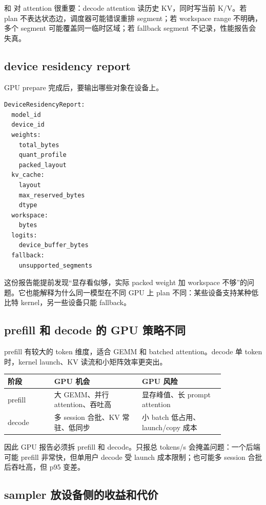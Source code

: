  和  对 attention 很重要：decode attention 读历史 KV，同时写当前 K/V。若 plan 不表达状态边，调度器可能错误重排 segment；若 workspace range 不明确，多个 segment 可能覆盖同一临时区域；若 fallback segment 不记录，性能报告会失真。

\subsection{device residency report}

GPU prepare 完成后，要输出哪些对象在设备上。

\begin{lstlisting}[numbers=none,caption={DeviceResidencyReport}]
DeviceResidencyReport:
  model_id
  device_id
  weights:
    total_bytes
    quant_profile
    packed_layout
  kv_cache:
    layout
    max_reserved_bytes
    dtype
  workspace:
    bytes
  logits:
    device_buffer_bytes
  fallback:
    unsupported_segments
\end{lstlisting}

这份报告能提前发现“显存看似够，实际 packed weight 加 workspace 不够”的问题。它也能解释为什么同一模型在不同 GPU 上 plan 不同：某些设备支持某种低比特 kernel，另一些设备只能 fallback。

\subsection{prefill 和 decode 的 GPU 策略不同}

prefill 有较大的 token 维度，适合 GEMM 和 batched attention。decode 单 token 时，kernel launch、KV 读流和小矩阵效率更突出。

\begin{center}
\begin{tabular}{p{0.18\linewidth}p{0.34\linewidth}p{0.32\linewidth}}
\toprule
阶段 & GPU 机会 & GPU 风险 \\
\midrule
prefill & 大 GEMM、并行 attention、吞吐高 & 显存峰值、长 prompt attention \\
decode & 多 session 合批、KV 常驻、低同步 & 小 batch 低占用、launch/copy 成本 \\
\bottomrule
\end{tabular}
\end{center}

因此 GPU 报告必须拆 prefill 和 decode。只报总 tokens/s 会掩盖问题：一个后端可能 prefill 非常快，但单用户 decode 受 launch 成本限制；也可能多 session 合批后吞吐高，但 p95 变差。

\subsection{sampler 放设备侧的收益和代价}


